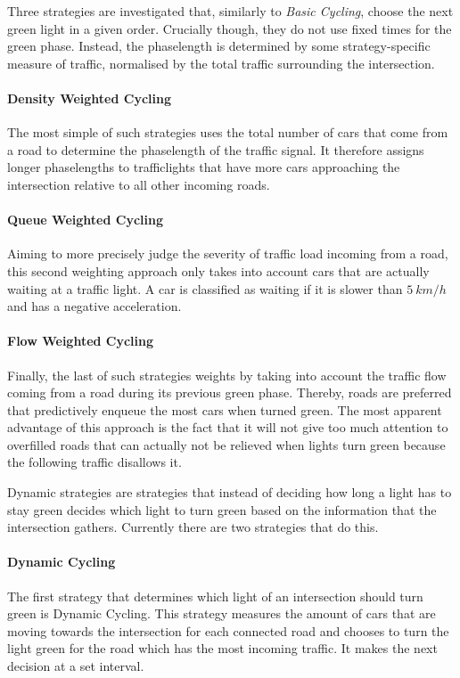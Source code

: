 \documentclass[11pt]{article}
\begin{document}
Three strategies are investigated that, similarly to \textit{Basic Cycling}, choose the next green light in a given order. Crucially though, they do not use fixed times for the green phase. Instead, the phaselength is determined by some strategy-specific measure of traffic, normalised by the total traffic surrounding the intersection.

\paragraph{Density Weighted Cycling} The most simple of such strategies uses the total number of cars that come from a road to determine the phaselength of the traffic signal. It therefore assigns longer phaselengths to trafficlights that have more cars approaching the intersection relative to all other incoming roads.

\paragraph{Queue Weighted Cycling} Aiming to more precisely judge the severity of traffic load incoming from a road, this second weighting approach only takes into account cars that are actually waiting at a traffic light. A car is classified as waiting if it is slower than $5\ km/h$ and has a negative acceleration.

\paragraph{Flow Weighted Cycling} Finally, the last of such strategies weights by taking into account the traffic flow coming from a road during its previous green phase. Thereby, roads are preferred that predictively enqueue the most cars when turned green. The most apparent advantage of this approach is the fact that it will not give too much attention to overfilled roads that can actually not be relieved when lights turn green because the following traffic disallows it.

\vspace{20pt}
Dynamic strategies are strategies that instead of deciding how long a light has to stay green decides which light to turn green based on the information that the intersection gathers. Currently there are two strategies that do this.

\paragraph{Dynamic Cycling} The first strategy that determines which light of an intersection should turn green is Dynamic Cycling. This strategy measures the amount of cars that are moving towards the intersection for each connected road and chooses to turn the light green for the road which has the most incoming traffic. It makes the next decision at a set interval.
\end{document}
